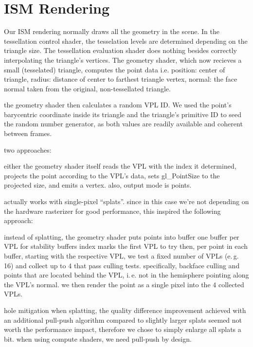 \section{ISM Rendering}
\label{sec:impl:ismRendering}
\begin{outline}
\1 Our ISM rendering normally draws all the geometry in the scene.
\1 In the tessellation control shader, the tesselation levels are determined depending on the triangle size.
\1 The tessellation evaluation shader does nothing besides correctly interpolating the triangle's vertices.
\1 The geometry shader, which now recieves a small (tesselated) triangle, computes the point data
\1 i.e. position: center of triangle, radius: distance of center to farthest triangle vertex, normal: the face normal taken from the original, non-tessellated triangle.

\1 the geometry shader then calculates a random VPL ID. We used the point's barycentric coordinate inside its triangle and the triangle's primitive ID to seed the random number generator, as both values are readily available and coherent between frames.

\1 two approaches:

\1 either the geometry shader itself reads the VPL with the index it determined, projects the point according to the VPL's data, sets gl\_PointSize to the projected size, and emits a vertex.
\1 also, output mode is points.

\1 \citet{Marroquim:2007:reconstruction} actually works with single-pixel ``splats''. since in this case we're not depending on the hardware rasterizer for good performance, this inspired the following approach:

\1 instead of splatting, the geometry shader puts points into buffer
\1 one buffer per VPL for stability
\1 buffers index marks the first VPL to try
\1 then, per point in each buffer, starting with the respective VPL, we test a fixed number of VPLs (e.\,g. 16) and collect up to 4 that pass culling tests.
\1 specifically, backface culling and points that are located behind the VPL, i.\,e. not in the hemisphere pointing along the VPL's normal.
\1 we then render the point as a single pixel into the 4 collected VPLs.



\1 hole mitigation
\1 when splatting, the quality difference improvement achieved with an additional pull-push algorithm compared to slightly larger splats seemed not worth the performance impact, therefore we chose to simply enlarge all splats a bit.
\1 when using compute shaders, we need pull-push by design.
\end{outline}

